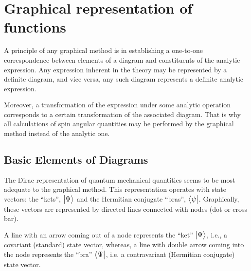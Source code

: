 \section{Graphical representation of functions}\label{sec:11.1}
A principle of any graphical method is in establishing a one-to-one correspondence between elements of a diagram and constituents of the analytic expression. Any expression inherent in the theory may be represented by a definite diagram, and vice versa, any such diagram represents a definite analytic expression.

Moreover, a transformation of the expression under some analytic operation corresponds to a certain transformation of the associated diagram. That is why all calculations of spin angular quantities may be performed by the graphical method instead of the analytic one.
\subsection{Basic Elements of Diagrams}\label{sec:11.1.1}
The Dirac representation of quantum mechanical quantities seems to be most adequate to the graphical method. This representation operates with state vectors: the ``kets'', \(\bigl| \Psi \bigr\rangle\) and the Hermitian conjugate ``bras'', \(\bigl\langle \psi \bigr|\). Graphically, these vectors are represented by directed lines connected with nodes (dot or cross bar).

A line with an arrow coming out of a node represents the ``ket'' \(\bigl| \Psi \bigr\rangle\), i.e., a covariant (standard) state vector, whereas, a line with double arrow coming into the node represents the ``bra'' \(\bigl\langle \Psi \bigr|\), i.e. a contravariant (Hermitian conjugate) state vector.

